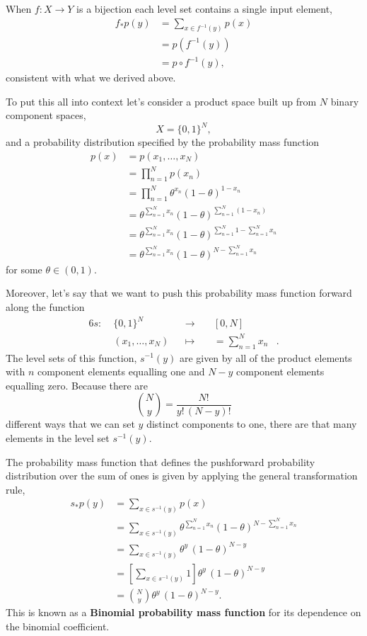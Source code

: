 \documentclass[
  letterpaper,
  DIV=11,
  numbers=noendperiod]{scrartcl}
\begin{document}
When \(f : X \rightarrow Y\) is a bijection each level set contains a
single input element, \begin{align*}
f_{*} p(y)
&= \sum_{x \in f^{-1}(y)} p(x)
\\
&= p(f^{-1}(y))
\\
&= p \circ f^{-1}(y),
\end{align*} consistent with what we derived above.

To put this all into context let's consider a product space built up
from \(N\) binary component spaces, \[
X = \{ 0, 1 \}^{N},
\] and a probability distribution specified by the probability mass
function \begin{align*}
p(x)
&=
p(x_{1}, \ldots, x_{N})
\\
&=
\prod_{n = 1}^{N} p(x_{n})
\\
&=
\prod_{n = 1}^{N} \theta^{x_{n}} (1 - \theta)^{1 - x_{n}}
\\
&=
\theta^{\sum_{n = 1}^{N} x_{n}}
(1 - \theta)^{\sum_{n = 1}^{N} (1 - x_{n})}
\\
&=
\theta^{\sum_{n = 1}^{N} x_{n}}
(1 - \theta)^{\sum_{n = 1}^{N} 1 - \sum_{n = 1}^{N} x_{n}}
\\
&=
\theta^{\sum_{n = 1}^{N} x_{n}}
(1 - \theta)^{N - \sum_{n = 1}^{N} x_{n}}
\end{align*} for some \(\theta \in (0, 1)\).

Moreover, let's say that we want to push this probability mass function
forward along the function \begin{alignat*}{6}
s :\; & \{ 0, 1 \}^{N} & &\rightarrow& \; & [0, N] &
\\
& (x_{1}, \ldots, x_{N} ) & &\mapsto& & = \sum_{n = 1}^{N} x_{n}  &.
\end{alignat*} The level sets of this function, \(s^{-1}(y)\) are given
by all of the product elements with \(n\) component elements equalling
one and \(N - y\) component elements equalling zero. Because there are
\[
{N \choose y} = \frac{N!}{y! \, (N - y)!}
\] different ways that we can set \(y\) distinct components to one,
there are that many elements in the level set \(s^{-1}(y)\).

The probability mass function that defines the pushforward probability
distribution over the sum of ones is given by applying the general
transformation rule, \begin{align*}
s_{*} p(y)
&=
\sum_{x \in s^{-1}(y) } p(x)
\\
&=
\sum_{x \in s^{-1}(y) }
\theta^{\sum_{n = 1}^{N} x_{n}}
(1 - \theta)^{N - \sum_{n = 1}^{N} x_{n}}
\\
&=
\sum_{x \in s^{-1}(y) }
\theta^{y} \, (1 - \theta)^{N - y}
\\
&=
\left[ \sum_{x \in s^{-1}(y) } 1 \right]
\theta^{y} \, (1 - \theta)^{N - y}
\\
&=
{N \choose y} \theta^{y} \, (1 - \theta)^{N - y}.
\end{align*} This is known as a \textbf{Binomial probability mass
function} for its dependence on the binomial coefficient.
\end{document}

